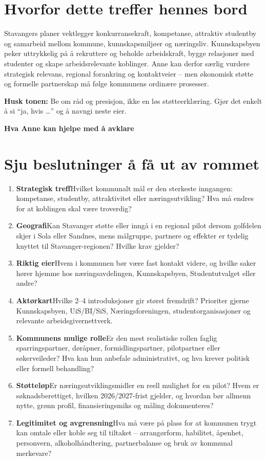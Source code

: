 \documentclass[10pt,a4paper]{article}
\newcommand{\ask}[2]{\textbf{\color{green}#1}\quad #2}
\begin{document}
\section{Hvorfor dette treffer hennes bord}

Stavangers planer vektlegger konkurransekraft, kompetanse, attraktiv studentby og samarbeid mellom kommune, kunnskapsmiljøer og næringsliv. Kunnskapsbyen peker uttrykkelig på å rekruttere og beholde arbeidskraft, bygge relasjoner med studenter og skape arbeidsrelevante koblinger. Anne kan derfor særlig vurdere strategisk relevans, regional forankring og kontaktveier -- men økonomisk støtte og formelle partnerskap må følge kommunens ordinære prosesser.

\vfill
{\small\color{muted}\textbf{Husk tonen:} Be om råd og presisjon, ikke en løs støtteerklæring. Gjør det enkelt å si ``ja, hvis \ldots'' og å navngi neste eier.}

\newpage
\small

{\LARGE\bfseries\color{ink} Hva Anne kan hjelpe med å avklare}

\section{Sju beslutninger å få ut av rommet}

\begin{enumerate}[leftmargin=7mm,itemsep=2.2pt,topsep=1pt]
\item \ask{Strategisk treff}{Hvilket kommunalt mål er den sterkeste inngangen: kompetanse, studentby, attraktivitet eller næringsutvikling? Hva må endres for at koblingen skal være troverdig?}
\item \ask{Geografi}{Kan Stavanger støtte eller inngå i en regional pilot dersom golfdelen skjer i Sola eller Sandnes, mens målgruppe, partnere og effekter er tydelig knyttet til Stavanger-regionen? Hvilke krav gjelder?}
\item \ask{Riktig eier}{Hvem i kommunen bør være fast kontakt videre, og hvilke saker hører hjemme hos næringsavdelingen, Kunnskapsbyen, Studentutvalget eller andre?}
\item \ask{Aktørkart}{Hvilke 2--4 introduksjoner gir størst fremdrift? Prioriter gjerne Kunnskapsbyen, UiS/BI/SiS, Næringsforeningen, studentorganisasjoner og relevante arbeidsgivernettverk.}
\item \ask{Kommunens mulige rolle}{Er den mest realistiske rollen faglig sparringspartner, døråpner, formidlingspartner, pilotpartner eller søkerveileder? Hva kan hun anbefale administrativt, og hva krever politisk eller formell behandling?}
\item \ask{Støtteløp}{Er næringsutviklingsmidler en reell mulighet for en pilot? Hvem er søknadsberettiget, hvilken 2026/2027-frist gjelder, og hvordan bør allmenn nytte, grønn profil, finansieringsmiks og måling dokumenteres?}
\item \ask{Legitimitet og avgrensning}{Hva må være på plass for at kommunen trygt kan omtale eller koble seg til tiltaket -- arrangørform, habilitet, åpenhet, personvern, alkoholhåndtering, partnerbalanse og bruk av kommunal merkevare?}
\end{enumerate}
\end{document}
